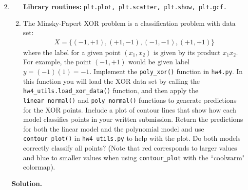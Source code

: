 \documentclass{article}
\theoremstyle{definition}
\theoremstyle{remark}
\newenvironment{Q}
{%
  \clearpage
  \item
  }
  {%
    \phantom{s} %
    \bigskip
    \textbf{Solution.}
  }
\begin{document}
\begin{enumerate}[font={\Large\bfseries},left=0pt]
\begin{Q}
\begin{enumerate}
  \textbf{Library routines:} \texttt{plt.plot, plt.scatter, plt.show, plt.gcf.}
  
  \item The Minsky-Papert XOR problem is a classification problem with data set: \begin{align*}
  X = \{(-1,+1), (+1,-1), (-1,-1),(+1,+1)\}
\end{align*}
where the label for a given point $(x_1,x_2)$ is given by its product $x_1x_2$.  For example, the point $(-1,+1)$ would be given label $y = (-1)(1) = -1$.  Implement the \texttt{poly\_xor()} function in \texttt{hw4.py}.  In this function you will load the XOR data set by calling the \texttt{hw4\_utils.load\_xor\_data()} function, and then apply the \texttt{linear\_normal()} and \texttt{poly\_normal()} functions to generate predictions for the XOR points. Include a plot of contour lines that show how each model classifies points in your written submission. Return the predictions for both the linear model and the polynomial model and use \texttt{contour\_plot()} in \texttt{hw4\_utils.py} to help with the plot. Do both models correctly classify all points? (Note that red corresponds to larger values and blue to smaller values when using \texttt{contour\_plot} with the ``coolwarm" colormap).


\end{enumerate}
\end{Q}
\end{enumerate}
\end{document}

